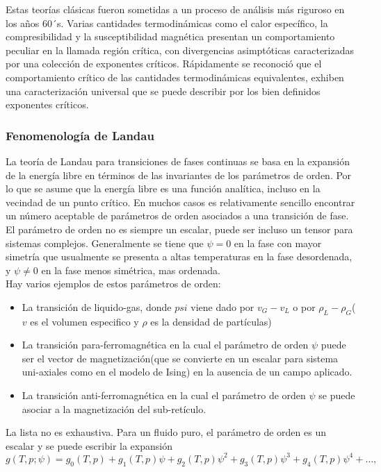 \documentclass[a4paper]{article}
\begin{document}
Estas teorías clásicas fueron sometidas a un proceso de análisis más riguroso en los años 60´s. Varias cantidades termodinámicas como el calor específico, la compresibilidad y la susceptibilidad magnética presentan un comportamiento peculiar en la llamada región crítica, con divergencias asimptóticas caracterizadas por una colección de exponentes críticos. Rápidamente se reconoció que el comportamiento crítico de las cantidades termodinámicas equivalentes, exhiben una caracterización universal que se puede describir por los bien definidos exponentes críticos.  \\
\subsubsection{Fenomenología de Landau}
La teoría de Landau para transiciones de fases continuas se basa en la expansión de la energía libre en términos de las invariantes de los parámetros de orden. Por lo que se asume que la energía libre es una función analítica, incluso en la vecindad de un punto crítico. En muchos casos es relativamente sencillo  encontrar un número aceptable  de parámetros de orden asociados a una transición de fase. El parámetro de orden no es siempre un escalar, puede ser incluso un tensor para sistemas complejos. Generalmente se tiene que $\psi=0$ en la fase con mayor simetría que usualmente se presenta a altas temperaturas en la fase desordenada, y $\psi\neq0$ en la fase menos simétrica, mas ordenada.\\
Hay varios ejemplos de estos parámetros de orden:
\begin{itemize}
\item La transición de liquido-gas, donde $psi$ viene dado por $v_G-v_L$ o por $\rho_L-\rho_G$($v$ es el volumen especifico y $\rho$ es la densidad de partículas)
\item La transición para-ferromagnética en la cual el parámetro de orden $\psi$ puede ser el vector de magnetización(que se convierte en un escalar para sistema uni-axiales como en el modelo de Ising) en la ausencia de un campo aplicado.
\item La transición anti-ferromagnética  en la cual el parámetro de orden $\psi$ se puede asociar a la magnetización del sub-retículo.
\end{itemize}
La lista no es exhaustiva. Para un fluido puro, el parámetro de orden es un escalar y se puede escribir la expansión
\begin{equation}
g(T,p;\psi)=g_0(T,p)+g_1(T,p)\psi+g_2(T,p)\psi^2+g_3(T,p)\psi^3+g_4(T,p)\psi^4+\hdots,
\end{equation}
\end{document}
